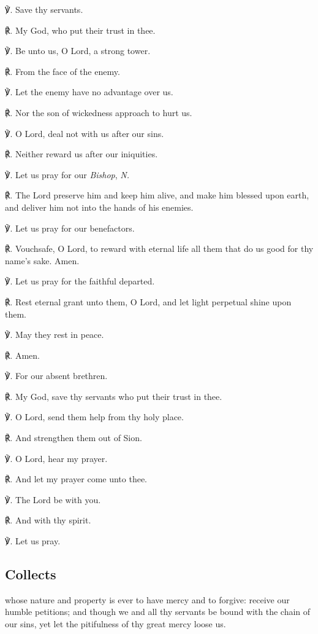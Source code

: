 \begin{multicols}{2}
\sloppy

℣. Save thy servants.\par
℟. My God, who put their trust in thee.\par
℣. Be unto us, O Lord, a strong tower.\par
℟. From the face of the enemy.\par
℣. Let the enemy have no advantage over us.\par
℟. Nor the son of wickedness approach to hurt us.\par
℣. O Lord, deal not with us after our sins.\par
℟. Neither reward us after our iniquities.\par
℣. Let us pray for our \textit{Bishop}, \textit{N.}\par
℟. The Lord preserve him and keep him alive, and make him blessed upon earth, and deliver him not into the hands of his enemies.\par
℣. Let us pray for our benefactors.\par
℟. Vouchsafe, O Lord, to reward with eternal life all them that do us good for thy name's sake. Amen.\par
℣. Let us pray for the faithful departed.\par
℟. Rest eternal grant unto them, O Lord, and let light perpetual shine upon them.\par
℣. May they rest in peace.\par
℟. Amen.\par
℣. For our absent brethren.\par
℟. My God, save thy servants who put their trust in thee.\par
℣. O Lord, send them help from thy holy place.\par
℟. And strengthen them out of Sion.\par
℣. O Lord, hear my prayer.\par
℟. And let my prayer come unto thee.\par
℣. The Lord be with you.\par
℟. And with thy spirit.\par
℣. Let us pray.

\fussy
\end{multicols}

\subsection{Collects}
 whose nature and property is ever to have mercy and to forgive: receive our humble petitions; and though we and all thy servants be bound with the chain of our sins, yet let the pitifulness of thy great mercy loose us.

